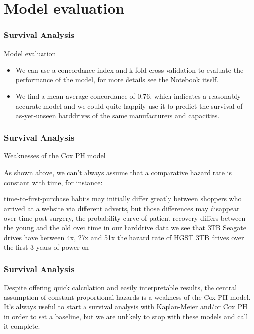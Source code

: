 \documentclass[]{beamer}
\begin{document}
	\section{Model evaluation}
	\begin{frame}
		\frametitle{Survival Analysis}
		Model evaluation
		\begin{itemize}
			\item We can use a concordance index and k-fold cross validation to evaluate the performance of the model, for more details see the Notebook itself.
			
			\item We find a mean average concordance of 0.76, which indicates a reasonably accurate model and we could quite happily use it to predict the survival of as-yet-unseen harddrives of the same manufacturers and capacities.
		\end{itemize}
		
		
	\end{frame}
	\begin{frame}
		\frametitle{Survival Analysis}
		
		Weaknesses of the Cox PH model
		
		As shown above, we can't always assume that a comparative hazard rate is constant with time, for instance:
		
		time-to-first-purchase habits may initially differ greatly between shoppers who arrived at a website via different adverts, but those differences may disappear over time
		post-surgery, the probability curve of patient recovery differs between the young and the old over time
		in our harddrive data we see that 3TB Seagate drives have between 4x, 27x and 51x the hazard rate of HGST 3TB drives over the first 3 years of power-on
	\end{frame}
	\begin{frame}
		\frametitle{Survival Analysis}
		Despite offering quick calculation and easily interpretable results, the central assumption of constant proportional hazards is a weakness of the Cox PH model. It's always useful to start a survival analysis with Kaplan-Meier and/or Cox PH in order to set a baseline, but we are unlikely to stop with these models and call it complete.
	\end{frame}
\end{document}
